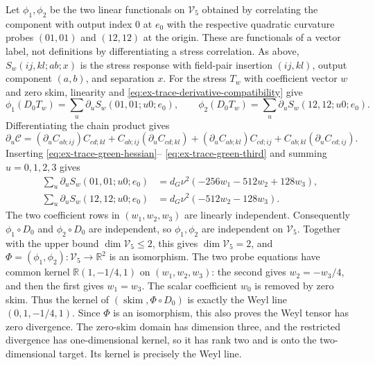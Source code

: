Let $\phi_1,\phi_2$ be the two linear functionals on $\mathcal V_5$
obtained by correlating the component with output index $0$ at $e_0$
with the respective quadratic curvature probes $(01,01)$ and $(12,12)$
at the origin. These are functionals of a vector label, not definitions
by differentiating a stress correlation. As above,
$S_w(ij,kl;ab;x)$ is the stress response with field-pair insertion
$(ij,kl)$, output component $(a,b)$, and separation $x$.
For the stress $T_w$ with coefficient vector $w$ and zero skim, linearity and
\eqref{eq:ex-trace-derivative-compatibility} give
\[
 \phi_1(D_0T_w)=\sum_u\partial_uS_w(01,01;u0;e_0),\qquad
 \phi_2(D_0T_w)=\sum_u\partial_uS_w(12,12;u0;e_0).
\]
Differentiating the chain product gives
\[
 \partial_u\mathcal C
 = (\partial_u C_{ab;ij})C_{cd;kl}
  +C_{ab;ij}(\partial_u C_{cd;kl})
  +(\partial_u C_{ab;kl})C_{cd;ij}
  +C_{ab;kl}(\partial_u C_{cd;ij}).
\]
Inserting \eqref{eq:ex-trace-green-hessian}--
\eqref{eq:ex-trace-green-third} and summing $u=0,1,2,3$ gives
\begin{align}
 \sum_u\partial_uS_w(01,01;u0;e_0)
   &=d_G\nu^2(-256w_1-512w_2+128w_3),\\
 \sum_u\partial_uS_w(12,12;u0;e_0)
   &=d_G\nu^2(-512w_2-128w_3).
 \label{eq:ex-trace-divergence-probes}
\end{align}
The two coefficient rows in $(w_1,w_2,w_3)$ are linearly independent.
Consequently $\phi_1\circ D_0$ and $\phi_2\circ D_0$ are independent,
so $\phi_1,\phi_2$ are independent on $\mathcal V_5$. Together with the
upper bound $\dim\mathcal V_5\le2$, this gives $\dim\mathcal V_5=2$,
and $\Phi=(\phi_1,\phi_2):\mathcal V_5\to\mathbb R^2$ is an
isomorphism. The two probe equations have common kernel
$\mathbb R(1,-1/4,1)$ on $(w_1,w_2,w_3)$: the second gives
$w_2=-w_3/4$, and then the first gives $w_1=w_3$. The scalar coefficient
$w_0$ is removed by zero skim. Thus the kernel of $(\operatorname{skim},
\Phi\circ D_0)$ is exactly the Weyl line $(0,1,-1/4,1)$. Since $\Phi$
is an isomorphism, this also proves the Weyl tensor has zero divergence.
The zero-skim domain has dimension three, and the restricted divergence has
one-dimensional kernel, so it has rank two and is onto the two-dimensional
target. Its kernel is precisely the Weyl line.


